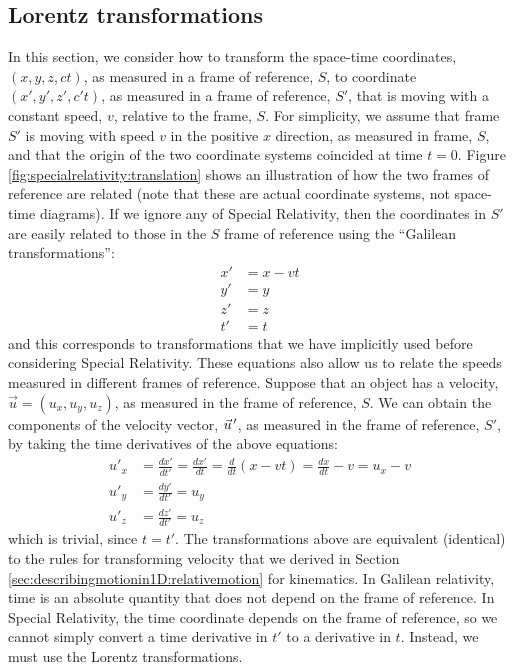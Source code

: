 \subsection{Lorentz transformations}
In this section, we consider how to transform the space-time coordinates, $(x,y,z,ct)$, as measured in a frame of reference, $S$, to coordinate $(x',y',z',c't)$, as measured in a frame of reference, $S'$, that is moving with a constant speed, $v$, relative to the frame, $S$. For simplicity, we assume that frame $S'$ is moving with speed $v$ in the positive $x$ direction, as measured in frame, $S$, and that the origin of the two coordinate systems coincided at time $t=0$. Figure \ref{fig:specialrelativity:translation} shows an illustration of how the two frames of reference are related (note that these are actual coordinate systems, not space-time diagrams).
If we ignore any of Special Relativity, then the coordinates in $S'$ are easily related to those in the $S$ frame of reference using the ``Galilean transformations'':
\begin{align*}
x' &= x - vt\\
y' &= y\\
z' &= z\\
t' &= t
\end{align*}
and this corresponds to transformations that we have implicitly used before considering Special Relativity. These equations also allow us to relate the speeds measured in different frames of reference. Suppose that an object has a velocity, $\vec u=(u_x,u_y,u_z)$, as measured in the frame of reference, $S$. We can obtain the components of the velocity vector, $\pvec u'$, as measured in the frame of reference, $S'$, by taking the time derivatives of the above equations:
\begin{align*}
u'_x &= \frac{dx'}{dt'}=\frac{dx'}{dt}=\frac{d}{dt}(x-vt)=\frac{dx}{dt}-v=u_x - v\\
u'_y &=\frac{dy'}{dt'}=u_y\\
u'_z &=\frac{dz'}{dt'}=u_z
\end{align*}
which is trivial, since $t=t'$. The transformations above are equivalent (identical) to the rules for transforming velocity that we derived in Section \ref{sec:describingmotionin1D:relativemotion} for kinematics. In Galilean relativity, time is an absolute quantity that does not depend on the frame of reference. In Special Relativity, the time coordinate depends on the frame of reference, so we cannot simply convert a time derivative in $t'$ to a derivative in $t$. Instead, we must use the Lorentz transformations.

